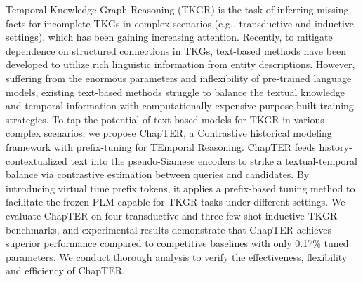 Temporal Knowledge Graph Reasoning (TKGR) is the task of inferring missing facts for incomplete TKGs in complex scenarios (e.g., transductive and inductive settings), which has been gaining increasing attention. Recently, to mitigate dependence on structured connections in TKGs, text-based methods have been developed to utilize rich linguistic information from entity descriptions. However, suffering from the enormous parameters and inflexibility of pre-trained language models, existing text-based methods struggle to balance the textual knowledge and temporal information with computationally expensive purpose-built training strategies. To tap the potential of text-based models for TKGR in various complex scenarios, we propose ChapTER, a Contrastive historical modeling framework with prefix-tuning for TEmporal Reasoning. ChapTER feeds history-contextualized text into the pseudo-Siamese encoders to strike a textual-temporal balance via contrastive estimation between queries and candidates. By introducing virtual time prefix tokens, it applies a prefix-based tuning method to facilitate the frozen PLM capable for TKGR tasks under different settings. We evaluate ChapTER on four transductive and three few-shot inductive TKGR benchmarks, and experimental results demonstrate that ChapTER achieves superior performance compared to competitive baselines with only 0.17\% tuned parameters. We conduct thorough analysis to verify the effectiveness, flexibility and efficiency of ChapTER.